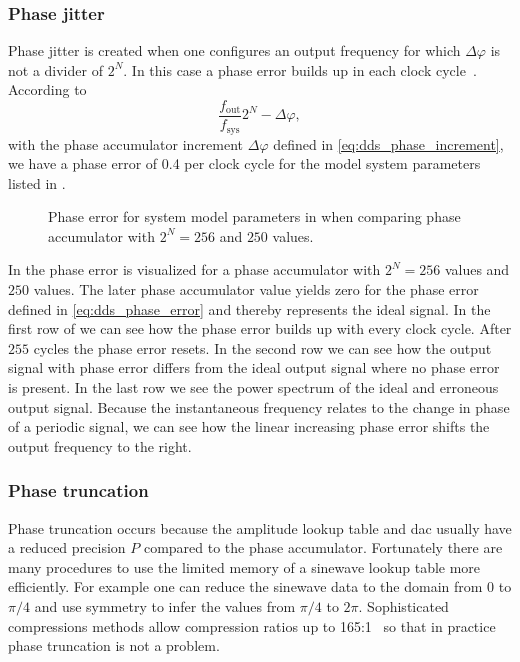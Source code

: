 \subsubsection{Phase jitter}

Phase jitter is created when one configures an output frequency for which
$\Delta\varphi$ is not a divider of $2^N$. In this case a phase error builds
up in each clock cycle~\cite{Vankka2013}. According to
\begin{equation}
  \frac{f_\text{out}}{f_\text{sys}}2^N-\Delta\varphi
  \label{eq:dds_phase_error},
\end{equation}
with the phase accumulator increment $\Delta\varphi$ defined in
\cref{eq:dds_phase_increment}, we have a phase error of \num{0.4} per clock
cycle for the model system parameters listed in . 
\begin{figure}[htb]
  \centering
  \begin{adjustbox}{width=\textwidth}
    
  \end{adjustbox}
  \caption{Phase error for system model parameters in
     when comparing phase accumulator with
    $2^N=256$ and $250$ values.
  }\label{fig:dds_phase_error}
\end{figure}
In  the phase error is visualized for a phase
accumulator with $2^N=256$ values and $250$ values. The later phase
accumulator value yields zero for the phase error defined in
\cref{eq:dds_phase_error} and thereby represents the ideal signal. In the
first row of  we can see how the phase error builds
up with every clock cycle. After $255$ cycles the phase error resets. In the
second row we can see how the output signal with phase error differs from the
ideal output signal where no phase error is present. In the last row we see
the power spectrum of the ideal and erroneous output signal. Because the
instantaneous frequency relates to the change in phase of a periodic signal,
we can see how the linear increasing phase error shifts the output frequency
to the right.

\subsubsection{Phase truncation}

Phase truncation occurs because the amplitude lookup table and \gls{dac}
usually have a reduced precision $P$ compared to the phase accumulator. 
Fortunately there are many procedures to use the limited memory of a sinewave
lookup table more efficiently. For example one can reduce the sinewave data to
the domain from $0$ to $\pi/4$ and use symmetry to infer the values from
$\pi/4$ to $2\pi$. Sophisticated compressions methods allow compression ratios
up to 165:1~\cite{Cordesses2004} so that in practice phase truncation is not a
problem.

